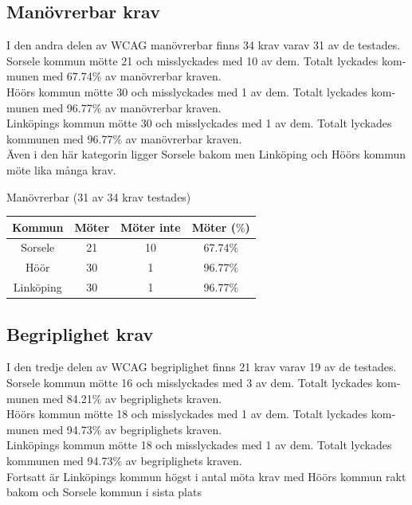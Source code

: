 \documentclass[11p]{article}
\begin{document}
\begin{otherlanguage}{swedish}
    \subsection{Manövrerbar krav}
    I den andra delen av WCAG manövrerbar finns 34 krav varav 31 av de testades.
    Sorsele kommun mötte 21 och misslyckades med 10 av dem.
    Totalt lyckades kommunen med 67.74$\%$ av manövrerbar kraven.
    \\Höörs kommun mötte 30 och misslyckades med 1 av dem.
    Totalt lyckades kommunen med 96.77$\%$ av manövrerbar kraven.
    \\Linköpings kommun mötte 30 och misslyckades med 1 av dem.
    Totalt lyckades kommunen med 96.77$\%$ av manövrerbar kraven.
    \\Även i den här kategorin ligger Sorsele bakom men Linköping och Höörs kommun möte lika många krav.

    \begin{center}
    Manövrerbar (31 av 34 krav testades)

    \begin{tabular}{ |c|c|c|c|}
        \hline
        Kommun & Möter & Möter inte & Möter ($\%$) \\  \hline
        Sorsele & 21 & 10 & 67.74$\%$ \\ \hline
        Höör & 30 & 1 & 96.77$\%$ \\ \hline
        Linköping & 30 & 1 & 96.77$\%$ \\ \hline
    \end{tabular}
    \end{center}

    \subsection{Begriplighet krav}
    I den tredje delen av WCAG begriplighet finns 21 krav varav 19 av de testades.
    Sorsele kommun mötte 16 och misslyckades med 3 av dem.
    Totalt lyckades kommunen med 84.21$\%$ av begriplighets kraven.
    \\Höörs kommun mötte 18 och misslyckades med 1 av dem.
    Totalt lyckades kommunen med 94.73$\%$ av begriplighets kraven.
    \\Linköpings kommun mötte 18 och misslyckades med 1 av dem.
    Totalt lyckades kommunen med 94.73$\%$ av begriplighets kraven.
    \\Fortsatt är Linköpings kommun högst i antal möta krav med Höörs kommun rakt bakom och Sorsele kommun i sista plats


\end{otherlanguage}
\end{document}
